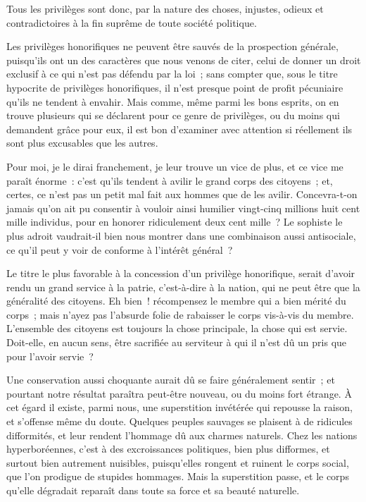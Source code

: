 \documentclass[french,twoside]{book} %
\begin{document}
Tous les privilèges sont donc, par la nature des choses, injustes, odieux et contradictoires à la fin suprême de toute société politique.\par
Les privilèges honorifiques ne peuvent être sauvés de la prospection générale, puisqu’ils ont un des caractères que nous venons de citer, celui de donner un droit exclusif à ce qui n’est pas défendu par la loi ; sans compter que, sous le titre hypocrite de privilèges honorifiques, il n’est presque point de profit pécuniaire qu’ils ne tendent à envahir. Mais comme, même parmi les bons esprits, on en trouve plusieurs qui se déclarent pour ce genre de privilèges, ou du moins qui demandent grâce pour eux, il est bon d’examiner avec attention si réellement ils sont plus excusables que les autres.\par
Pour moi, je le dirai franchement, je leur trouve un vice de plus, et ce vice me paraît énorme : c’est qu’ils tendent à avilir le grand corps des citoyens ; et, certes, ce n’est pas un petit mal fait aux hommes que de les avilir. Concevra-t-on jamais qu’on ait pu consentir à vouloir ainsi humilier vingt-cinq millions huit cent mille individus, pour en honorer ridiculement deux cent mille ? Le sophiste le plus adroit vaudrait-il bien nous montrer dans une combinaison aussi antisociale, ce qu’il peut y voir de conforme à l’intérêt général ?\par
Le titre le plus favorable à la concession d’un privilège honorifique, serait d’avoir rendu un grand service à la patrie, c’est-à-dire à la nation, qui ne peut être que la généralité des citoyens. Eh bien ! récompensez le membre qui a bien mérité du corps ; mais n’ayez pas l’absurde folie de rabaisser le corps vis-à-vis du membre. L’ensemble des citoyens est toujours la chose principale, la chose qui est servie. Doit-elle, en aucun sens, être sacrifiée au serviteur à qui il n’est dû un pris que pour l’avoir servie ?\par
Une conservation aussi choquante aurait dû se faire généralement sentir ; et pourtant notre résultat paraîtra peut-être nouveau, ou du moins fort étrange. À cet égard il existe, parmi nous, une superstition invétérée qui repousse la raison, et s’offense même du doute. Quelques peuples sauvages se plaisent à de ridicules difformités, et leur rendent l’hommage dû aux charmes naturels. Chez les nations hyperboréennes, c’est à des excroissances politiques, bien plus difformes, et surtout bien autrement nuisibles, puisqu’elles rongent et ruinent le corps social, que l’on prodigue de stupides hommages. Mais la superstition passe, et le corps qu’elle dégradait reparaît dans toute sa force et sa beauté naturelle.\par
\end{document}
